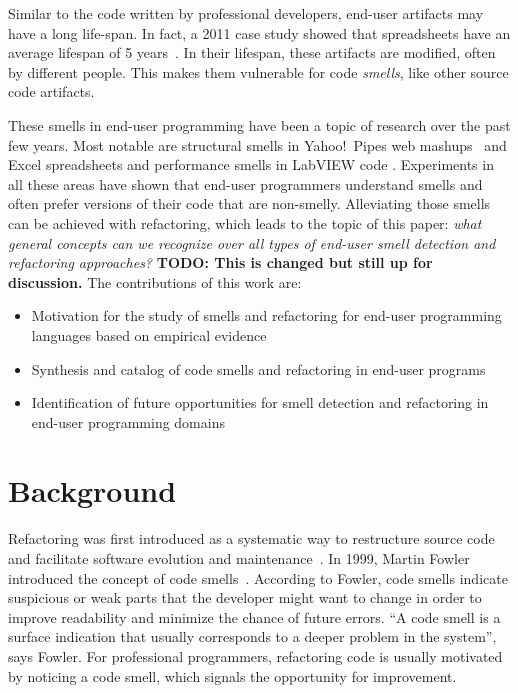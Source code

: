 \documentclass[10pt,conference,compsocconf]{IEEEtran}
\newcommand{\todo}[1]{\textbf{TODO: #1}}
\begin{document}
Similar to the code written by professional developers, end-user artifacts may have a long life-span. In fact, a 2011 case study showed that spreadsheets have an average lifespan of 5 years~\cite{Hermans2011}. In their lifespan, these artifacts are modified, often by different people. This makes them vulnerable for code \emph{smells}, like other source code artifacts. 

These smells in end-user programming have been a topic of research over the past few years. Most notable are structural smells in Yahoo!\ Pipes web mashups~\cite{Stolee2011} and  Excel spreadsheets \cite{Hermans2012inter} and performance smells in LabVIEW code \cite{chambers2013smell}. Experiments in all these areas have shown that end-user programmers understand smells and often prefer versions of their code that are non-smelly. Alleviating those smells can be achieved with refactoring, which leads to the topic of this paper: \emph{what general concepts can we recognize over all types of end-user smell detection and refactoring approaches?} \todo{This is changed but still up for discussion.} The contributions of this work are:

\begin{itemize}
	\item Motivation for the study of smells and refactoring for end-user programming languages based on empirical evidence
	\item Synthesis and catalog of code smells  and refactoring in end-user programs
	\item Identification of future opportunities for smell detection and refactoring in end-user programming domains
\end{itemize}

\section{Background}
\label{sec:background}


Refactoring was first introduced as a systematic way to restructure source code and facilitate software evolution and maintenance~\cite{Opdyke:1992:ROF:169783, Griswold:1993:AAP:152388.152389}. In 1999, Martin Fowler introduced the concept of code smells~\cite{Fowl1999}. 
According to Fowler, code smells indicate suspicious or weak parts that the developer might want to change in order to improve readability and minimize the chance of future errors. ``A code smell is a surface indication that usually corresponds to a deeper problem in the system'', says Fowler. For professional programmers, refactoring code is usually motivated by noticing a code smell, which signals the opportunity for improvement.
\end{document}
